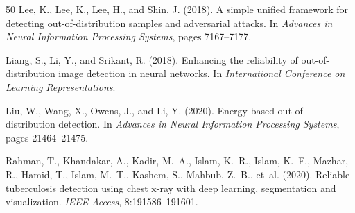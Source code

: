 \documentclass[11pt,a4paper]{article}
\begin{document}
\begin{thebibliography}{50}
Lee, K., Lee, K., Lee, H., and Shin, J. (2018).
A simple unified framework for detecting out-of-distribution samples and adversarial attacks.
In \emph{Advances in Neural Information Processing Systems}, pages 7167--7177.

Liang, S., Li, Y., and Srikant, R. (2018).
Enhancing the reliability of out-of-distribution image detection in neural networks.
In \emph{International Conference on Learning Representations}.

Liu, W., Wang, X., Owens, J., and Li, Y. (2020).
Energy-based out-of-distribution detection.
In \emph{Advances in Neural Information Processing Systems}, pages 21464--21475.

Rahman, T., Khandakar, A., Kadir, M.~A., Islam, K.~R., Islam, K.~F., Mazhar, R., Hamid, T., Islam, M.~T., Kashem, S., Mahbub, Z.~B., et~al. (2020).
Reliable tuberculosis detection using chest x-ray with deep learning, segmentation and visualization.
\emph{IEEE Access}, 8:191586--191601.

\end{thebibliography}
\end{document}
